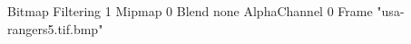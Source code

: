{Bitmap
	{Filtering 1}
	{Mipmap 0}
	{Blend none}
	{AlphaChannel 0}
	{Frame "usa-rangers5.tif.bmp"}
}
